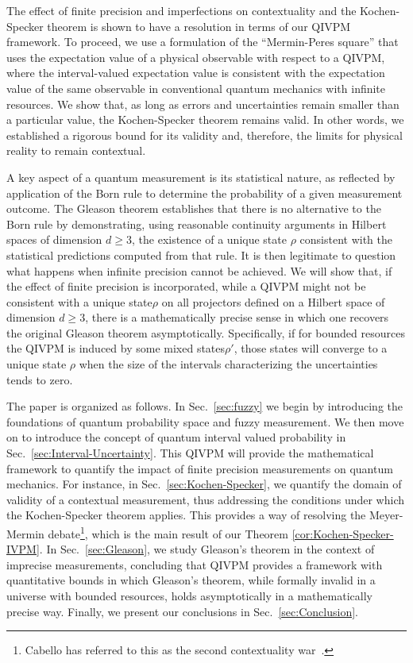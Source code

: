 \documentclass[english,reprint, aps, prl,superscriptaddress, showpacs,
showkeys, longbibliography, amsmath, amssymb]{revtex4-1}
\theoremstyle{plain}
\theoremstyle{definition}
\newcommand{\nb}{\nolinebreak[1] }
\begin{document}
The effect of finite precision and imperfections on contextuality and the
Kochen-Specker theorem is shown to have a resolution in terms of our QIVPM framework.  
To proceed, we use a formulation of the ``Mermin-Peres square''\nb\cite{peres1995quantum,Mermin1990Simple} that uses the
expectation value of a physical observable with respect
to a QIVPM, where the interval-valued
expectation value is consistent with the expectation value of the
same observable in conventional quantum mechanics with infinite resources. We show that, 
as long as errors and uncertainties remain smaller than a particular value, the
Kochen-Specker theorem remains valid. In other words, we established a rigorous bound for 
its validity and, therefore, the limits for physical reality to remain contextual.

A key aspect of a quantum measurement is its statistical nature, as reflected
by application of the Born rule to determine the probability of a given measurement 
outcome\nb\citep{Born1983,peres1995quantum,544199}. The Gleason
theorem establishes that there is no alternative to the Born rule by 
demonstrating, using reasonable continuity arguments in Hilbert spaces
of dimension $d\ge3$, the existence of a unique state 
$\rho$ consistent with the statistical predictions computed from 
that rule\nb\citep{gleason1957,Redhead1987-REDINA,peres1995quantum}.
It is then legitimate to question what happens when infinite precision
cannot be achieved. We will show that, if the effect of finite precision is incorporated, 
while a QIVPM  might not be consistent
with a unique state\nb$\rho$ on all projectors defined on a Hilbert space of dimension $d\ge3$, 
there is a mathematically precise sense in which one recovers the original Gleason theorem asymptotically. 
Specifically, if for bounded resources the QIVPM is induced by some mixed states\nb$\rho'$, 
those states will converge to a unique state $\rho$ when the size of the intervals characterizing 
the uncertainties tends to zero. 

The paper is organized as follows.   In Sec.\ \ref{sec:fuzzy} we begin by introducing the foundations of quantum probability space and fuzzy measurement.  We then move on to introduce the concept of quantum interval valued probability in Sec.\ \ref{sec:Interval-Uncertainty}.  This QIVPM will provide the mathematical framework to quantify the impact of finite precision measurements on quantum mechanics.  For instance, in Sec.\ \ref{sec:Kochen-Specker},  we quantify the domain of validity of a  contextual measurement, thus addressing the conditions under which the Kochen-Specker theorem applies.  This provides a way of resolving the Meyer-Mermin debate\nb\footnote{Cabello has referred to this as the second contextuality war~\citep{Cabello2017}.}, which is the main result of our Theorem \ref{cor:Kochen-Specker-IVPM}.  In Sec.\ \ref{sec:Gleason}, we study Gleason's theorem in the context of imprecise measurements, concluding that QIVPM provides a framework with quantitative bounds in which Gleason's theorem, while formally invalid in a universe with bounded resources, holds asymptotically in a mathematically precise way.  Finally, we present our conclusions in Sec.~\ref{sec:Conclusion}.
\end{document}
